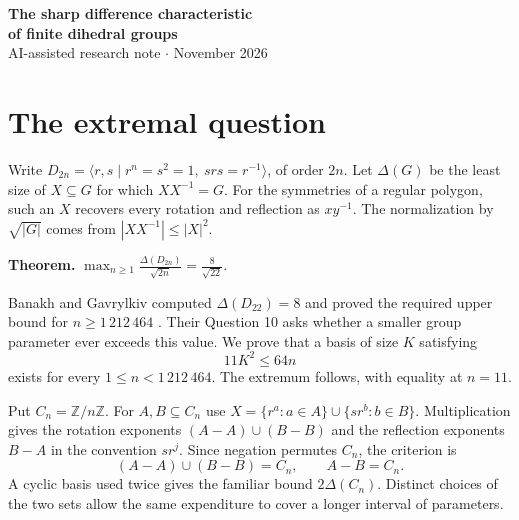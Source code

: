 \documentclass[11pt]{article}
\newcommand{\D}{\Delta}
\newcommand{\Z}{\mathbb Z}
\begin{document}
\begin{center}
{\Large\bfseries The sharp difference characteristic\\[3pt] of finite dihedral groups}\\[9pt]
AI-assisted research note \quad $\cdot$  November 2026
\end{center}
\begin{abstract}
A difference basis of a finite group represents every element as a quotient of two of its members. Banakh and Gavrylkiv asked whether the largest normalized difference size among dihedral groups is $8/\sqrt{22}$. We give an affirmative answer. Pairs of integer sets control the rotation and reflection cosets separately. Lifting each pair with a cyclic difference basis certifies an interval of group parameters. Sixty-nine such intervals and explicit witnesses for the remaining finite cases meet the published large-order bound. All finite checks use integer arithmetic.
\end{abstract}
\section{The extremal question}
Write $D_{2n}=\langle r,s\mid r^n=s^2=1,\ srs=r^{-1}\rangle$, of order $2n$. Let $\D(G)$ be the least size of $X\subseteq G$ for which $XX^{-1}=G$. For the symmetries of a regular polygon, such an $X$ recovers every rotation and reflection as $xy^{-1}$. The normalization by $\sqrt{|G|}$ comes from $|XX^{-1}|\le |X|^2$.

\textbf{Theorem.}\quad
$\displaystyle \max_{n\ge1}\frac{\D(D_{2n})}{\sqrt{2n}}=\frac8{\sqrt{22}}.$

Banakh and Gavrylkiv computed $\D(D_{22})=8$ and proved the required upper bound for $n\ge1\,212\,464$ \cite[Table 2 and Proposition 11]{BG}. Their Question 10 asks whether a smaller group parameter ever exceeds this value. We prove that a basis of size $K$ satisfying
\begin{equation}11K^2\le64n\label{budget}\end{equation}
exists for every $1\le n<1\,212\,464$. The extremum follows, with equality at $n=11$.

Put $C_n=\Z/n\Z$. For $A,B\subseteq C_n$ use $X=\{r^a:a\in A\}\cup\{sr^b:b\in B\}$. Multiplication gives the rotation exponents $(A-A)\cup(B-B)$ and the reflection exponents $B-A$ in the convention $sr^j$. Since negation permutes $C_n$, the criterion is
\begin{equation}
(A-A)\cup(B-B)=C_n,\qquad A-B=C_n. \label{criterion}
\end{equation}
A cyclic basis used twice gives the familiar bound $2\D(C_n)$. Distinct choices of the two sets allow the same expenditure to cover a longer interval of parameters.
\end{document}
